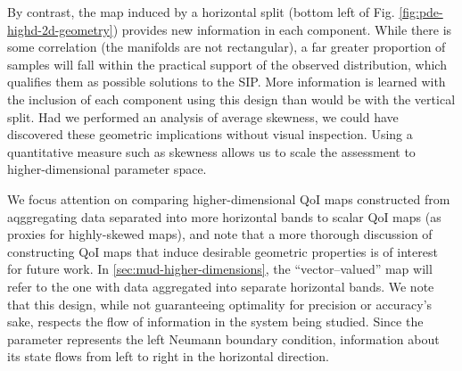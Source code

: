 By contrast, the map induced by a horizontal split (bottom left of Fig. \ref{fig:pde-highd-2d-geometry}) provides new information in each component.
While there is some correlation (the manifolds are not rectangular), a far greater proportion of samples will fall within the practical support of the observed distribution, which qualifies them as possible solutions to the SIP.
More information is learned with the inclusion of each component using this design than would be with the vertical split.
Had we performed an analysis of average skewness, we could have discovered these geometric implications without visual inspection.
Using a quantitative measure such as skewness allows us to scale the assessment to higher-dimensional parameter space.

We focus attention on comparing higher-dimensional QoI maps constructed from aqggregating data separated into more horizontal bands to scalar QoI maps (as proxies for highly-skewed maps), and note that a more thorough discussion of constructing QoI maps that induce desirable geometric properties is of interest for future work.
In \ref{sec:mud-higher-dimensions}, the ``vector--valued'' map will refer to the one with data aggregated into separate horizontal bands.
We note that this design, while not guaranteeing optimality for precision or accuracy's sake, respects the flow of information in the system being studied.
Since the parameter represents the left Neumann boundary condition, information about its state flows from left to right in the horizontal direction.

\FloatBarrier
